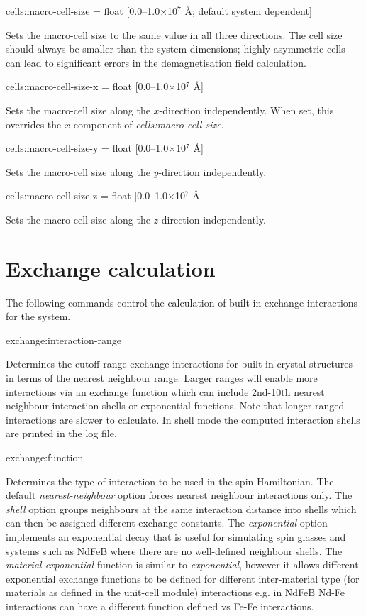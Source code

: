 {\zicf cells:macro-cell-size = float [0.0--1.0$\times$10$^7$ \AA; default system dependent]} Sets the macro-cell size to the same value in all three directions. The cell size should always be smaller than the system dimensions; highly asymmetric cells can lead to significant errors in the demagnetisation field calculation.

{\zicf cells:macro-cell-size-x = float [0.0--1.0$\times$10$^7$ \AA]} Sets the macro-cell size along the $x$-direction independently. When set, this overrides the $x$ component of \textit{cells:macro-cell-size}.

{\zicf cells:macro-cell-size-y = float [0.0--1.0$\times$10$^7$ \AA]} Sets the macro-cell size along the $y$-direction independently.

{\zicf cells:macro-cell-size-z = float [0.0--1.0$\times$10$^7$ \AA]} Sets the macro-cell size along the $z$-direction independently.

\section*{Exchange calculation}
The following commands control the calculation of built-in exchange interactions
for the system.

{\zicf exchange:interaction-range}
Determines the cutoff range exchange interactions for built-in crystal structures
in terms of the nearest neighbour range. Larger ranges will enable more interactions
via an exchange function which can include 2nd-10th nearest neighbour interaction
shells or exponential functions. Note that longer ranged interactions are slower
to calculate. In shell mode the computed interaction shells are printed in the
log file.

{\zicf exchange:function}
Determines the type of interaction to be used in the spin Hamiltonian. The
default \textit{nearest-neighbour} option forces nearest neighbour interactions
only. The \textit{shell} option groups neighbours at the same interaction
distance into shells which can then be assigned different exchange constants.
The \textit{exponential} option implements an exponential decay that is useful
for simulating spin glasses and systems such as NdFeB where there are no
well-defined neighbour shells. The \textit{material-exponential} function is
similar to \textit{exponential}, however it allows different exponential
exchange functions to be defined for different inter-material type (for
materials as defined in the unit-cell module) interactions e.g. in NdFeB
Nd-Fe interactions can have a different function defined vs Fe-Fe interactions.

